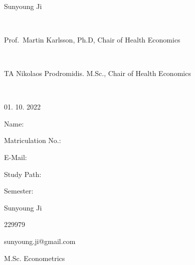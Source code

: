 \documentclass[11pt,a4paper]{article}
\begin{document}
\begin{titlepage}
\begin{center}
  \vspace{0.75cm}
  \large{}\\
  \vspace{0.5cm}
  Sunyoung Ji\\
  \end{center}
  \vfill
  \hrulefill

  \noindent\begin{minipage}[t]{0.3\textwidth}
  \end{minipage}\\
  \begin{minipage}[t]{0.7\textwidth}
  \hspace{1cm}Prof.~Martin Karlsson, Ph.D, Chair of Health Economics 
  \end{minipage} \\
    \begin{minipage}[t]{0.7\textwidth}
  \hspace{1cm}TA Nikolaos Prodromidis. M.Sc., Chair of Health Economics
  \end{minipage}

  \noindent\begin{minipage}[t]{0.3\textwidth}
  \end{minipage}\\
  \begin{minipage}[t]{0.7\textwidth}
  \hspace{1cm}01. 10. 2022
  \end{minipage}

  \hrulefill

  \begin{multicols}{1}

  Name:

  Matriculation No.:

  E-Mail:

  Study Path:

  Semester:

  \columnbreak

  Sunyoung Ji

  229979

  sunyoung.ji@gmail.com

  M.Sc. Econometrics


 

  \end{multicols}

\end{titlepage}
\end{document}
